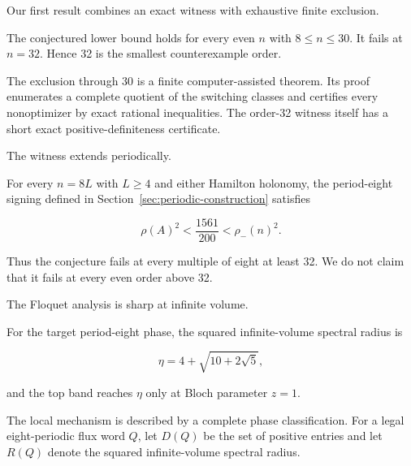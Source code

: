 Our first result combines an exact witness with exhaustive finite exclusion.

\begin{theorem}
\label{thm:smallest-counterexample}
The conjectured lower bound holds for
every even \(n\) with \(8\leq n\leq 30\). It fails at \(n=32\). Hence 32 is the smallest
counterexample order.

\end{theorem}
The exclusion through 30 is a finite computer-assisted theorem. Its proof
enumerates a complete quotient of the switching classes and certifies every
nonoptimizer by exact rational inequalities. The order-32 witness itself has a
short exact positive-definiteness certificate.

The witness extends periodically.

\begin{theorem}
\label{thm:infinite-counterexample-family}
For every \(n=8L\) with \(L\geq 4\)
and either Hamilton holonomy, the period-eight signing defined in Section~\ref{sec:periodic-construction}
satisfies

\begin{equation}
\rho(A)^{2} < \frac{1561}{200} < \rho_-(n)^{2}.
\end{equation}

Thus the conjecture fails at every multiple of eight at least 32. We do not
claim that it fails at every even order above 32.

\end{theorem}
The Floquet analysis is sharp at infinite volume.

\begin{theorem}
\label{thm:exact-period-eight-edge}
For the target period-eight phase,
the squared infinite-volume spectral radius is

\begin{equation}
\eta=4+\sqrt{10+2\sqrt{5}},
\end{equation}

and the top band reaches \(\eta\) only at Bloch parameter \(z=1\).

\end{theorem}
The local mechanism is described by a complete phase classification. For a
legal eight-periodic flux word \(Q\), let \(D(Q)\) be the set of positive entries
and let \(R(Q)\) denote the squared infinite-volume spectral radius.

